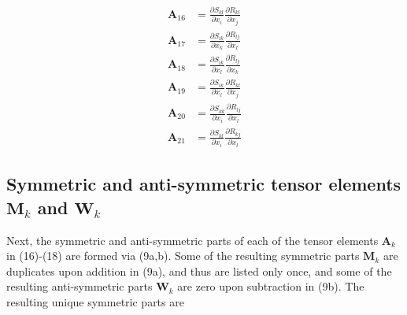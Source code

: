 %
\begin{subequations}
\begin{align}
	\label{E:35}
	\mathbf{A}_{16}  &= \frac{\partial S_{kl}}{\partial x_i}
					  \frac{\partial R_{kl}}{\partial x_j} \\
	\mathbf{A}_{17}  &= \frac{\partial S_{ik}}{\partial x_k}
					  \frac{\partial R_{lj}}{\partial x_l} \\
	\mathbf{A}_{18}  &= \frac{\partial S_{ik}}{\partial x_l}
					  \frac{\partial R_{lj}}{\partial x_k} \\
	\mathbf{A}_{19}  &= \frac{\partial S_{ik}}{\partial x_l}
					  \frac{\partial R_{kl}}{\partial x_j} \\
	\mathbf{A}_{20}  &= \frac{\partial S_{kk}}{\partial x_i}
				      \frac{\partial R_{lj}}{\partial x_l} \\ 				  
	\mathbf{A}_{21}  &= \frac{\partial S_{kl}}{\partial x_i}
				      \frac{\partial R_{kj}}{\partial x_l}    
\end{align}
\end{subequations}
%
%    
	 	

\subsection{Symmetric and anti-symmetric tensor elements $\mathbf{M}_k$ and $\mathbf{W}_k$}

Next, the symmetric and anti-symmetric parts of each of the tensor elements  $\mathbf{A}_k$in (16)-(18) are formed via (9a,b).  Some of the resulting symmetric parts $\mathbf{M}_k$  are duplicates upon addition in (9a), and thus are listed only once, and some of the resulting anti-symmetric parts $\mathbf{W}_k$  are zero upon subtraction in (9b).  The resulting unique symmetric parts are

